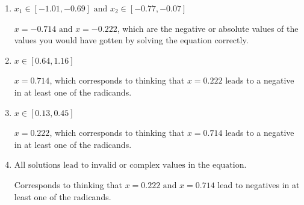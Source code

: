 \documentclass{extbook}[14pt]
\begin{document}
\begin{enumerate}
{\begin{enumerate}[label=\Alph*.]
* $x = 0.222 \text{ and } x = 0.714$, which is the correct option.
\item \( x_1 \in [-1.01, -0.69] \text{ and } x_2 \in [-0.77,-0.07] \)

$x = -0.714 \text{ and } x = -0.222$, which are the negative or absolute values of the values you would have gotten by solving the equation correctly.
\item \( x \in [0.64,1.16] \)

$x = 0.714$, which corresponds to thinking that $x = 0.222$ leads to a negative in at least one of the radicands.
\item \( x \in [0.13,0.45] \)

$x = 0.222$, which corresponds to thinking that $x = 0.714$ leads to a negative in at least one of the radicands.
\item \( \text{All solutions lead to invalid or complex values in the equation.} \)

Corresponds to thinking that $x = 0.222 \text{ and } x = 0.714$ lead to negatives in at least one of the radicands.
\end{enumerate}

}
\end{enumerate}
\end{document}
